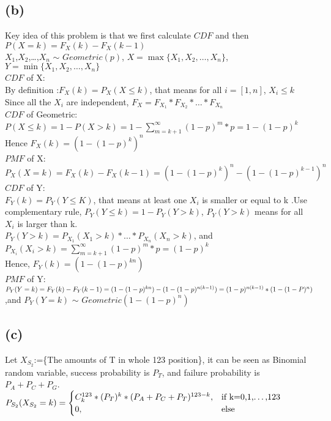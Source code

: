 \documentclass[a4paper,11pt]{article} %
\begin{document}
\subsection{(b)}
Key idea of this problem is that we first calculate $CDF$ and then $P(X=k) = F_X(k)- F_X(k-1)$\\
$X_1$,$X_2$,\dots,$X_n$ $\sim$ $Geometric(p)$, $X=\max\{X_1,X_2,\dots,X_n\}$, $Y=\min \{X_1,X_2,\dots,X_n\}$\\
$CDF$ of X:\\
By definition :$F_X(k)=P_X(X \leq k)$, that means for all $i=[1,n]$, $X_i \leq k$\\
Since all the $X_i$ are independent, $F_X = F_{X_1} * F_{X_2} * \dots * F_{X_n}$\\
$CDF$ of Geometric: $P(X \leq k)=1 - P(X>k) = 1- \sum_{m=k+1}^{\infty}(1-p)^{m}*p=1-(1-p)^k$\\
Hence $F_X(k)=(1-(1-p)^k)^n$\\ 
$PMF$ of X:\\
$P_X(X=k)=F_X(k)-F_X(k-1)=(1-(1-p)^k)^n-(1-(1-p)^{k-1})^n$\\
$CDF$ of Y:\\
$F_Y(k)=P_Y(Y \leq K)$, that means at least one $X_i$ is smaller or equal to k .Use complementary rule, $P_Y(Y \leq k) = 1-P_Y(Y>k)$, $P_Y(Y>k)$ means for all $X_i$ is larger than k.\\
$P_Y(Y>k)=P_{X_1}(X_1>k)*\dots *P_{X_n}(X_n>k)$, and $P_{X_i}(X_i>k)=\sum_{m=k+1}^{\infty}(1-p)^m*p=(1-p)^k$\\
Hence, $F_Y(k)=(1-(1-p)^{kn})$\\
$PMF$ of Y:\\
$P_Y(Y=k)=F_Y(k)-F_Y(k-1)=(1-(1-p)^{kn})-(1-(1-p)^{n(k-1)})\\=(1-p)^{n(k-1)}*(1-(1-P)^n)$\\
,and $P_Y(Y=k)$ $\sim$ $Geometric(1-(1-p)^{n})$

\subsection{(c)}
Let $X_{S_2}$:=\{The amounts of T in whole 123 position\}, it can be seen as Binomial random variable, success probability is $P_T$, and failure probability is $P_A+P_C+P_G$.\\
$P_{S_2}(X_{S_2}=k)=\begin{cases}
    C_{k}^{123}*(P_T)^k*(P_A+P_C+P_T)^{123-k},&\text{if k=0,1,\dots,123}\\
    0,&\text{else}
\end{cases}
$
\end{document}
